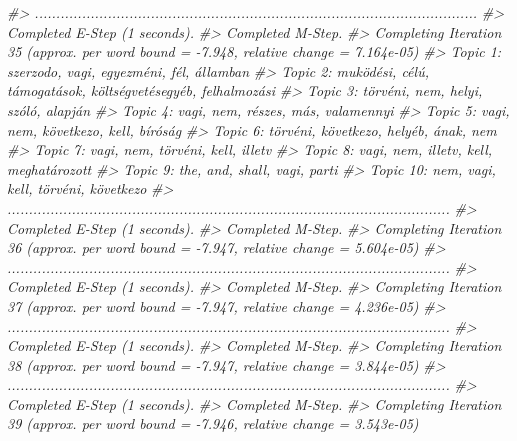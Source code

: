 \documentclass[
]{book}
\newenvironment{Shaded}{\begin{snugshade}}{\end{snugshade}}
\newcommand{\CommentTok}[1]{\textcolor[rgb]{0.56,0.35,0.01}{\textit{#1}}}
\begin{document}
\begin{Shaded}
\begin{Highlighting}[]
\CommentTok{\#\textgreater{} .......................................................................................................}
\CommentTok{\#\textgreater{} Completed E{-}Step (1 seconds). }
\CommentTok{\#\textgreater{} Completed M{-}Step. }
\CommentTok{\#\textgreater{} Completing Iteration 35 (approx. per word bound = {-}7.948, relative change = 7.164e{-}05) }
\CommentTok{\#\textgreater{} Topic 1: szerzodo, vagi, egyezméni, fél, államban }
\CommentTok{\#\textgreater{}  Topic 2: muködési, célú, támogatások, költségvetésegyéb, felhalmozási }
\CommentTok{\#\textgreater{}  Topic 3: törvéni, nem, helyi, szóló, alapján }
\CommentTok{\#\textgreater{}  Topic 4: vagi, nem, részes, más, valamennyi }
\CommentTok{\#\textgreater{}  Topic 5: vagi, nem, következo, kell, bíróság }
\CommentTok{\#\textgreater{}  Topic 6: törvéni, következo, helyéb, ának, nem }
\CommentTok{\#\textgreater{}  Topic 7: vagi, nem, törvéni, kell, illetv }
\CommentTok{\#\textgreater{}  Topic 8: vagi, nem, illetv, kell, meghatározott }
\CommentTok{\#\textgreater{}  Topic 9: the, and, shall, vagi, parti }
\CommentTok{\#\textgreater{}  Topic 10: nem, vagi, kell, törvéni, következo }
\CommentTok{\#\textgreater{} .......................................................................................................}
\CommentTok{\#\textgreater{} Completed E{-}Step (1 seconds). }
\CommentTok{\#\textgreater{} Completed M{-}Step. }
\CommentTok{\#\textgreater{} Completing Iteration 36 (approx. per word bound = {-}7.947, relative change = 5.604e{-}05) }
\CommentTok{\#\textgreater{} .......................................................................................................}
\CommentTok{\#\textgreater{} Completed E{-}Step (1 seconds). }
\CommentTok{\#\textgreater{} Completed M{-}Step. }
\CommentTok{\#\textgreater{} Completing Iteration 37 (approx. per word bound = {-}7.947, relative change = 4.236e{-}05) }
\CommentTok{\#\textgreater{} .......................................................................................................}
\CommentTok{\#\textgreater{} Completed E{-}Step (1 seconds). }
\CommentTok{\#\textgreater{} Completed M{-}Step. }
\CommentTok{\#\textgreater{} Completing Iteration 38 (approx. per word bound = {-}7.947, relative change = 3.844e{-}05) }
\CommentTok{\#\textgreater{} .......................................................................................................}
\CommentTok{\#\textgreater{} Completed E{-}Step (1 seconds). }
\CommentTok{\#\textgreater{} Completed M{-}Step. }
\CommentTok{\#\textgreater{} Completing Iteration 39 (approx. per word bound = {-}7.946, relative change = 3.543e{-}05) }

\end{Highlighting}
\end{Shaded}
\end{document}
